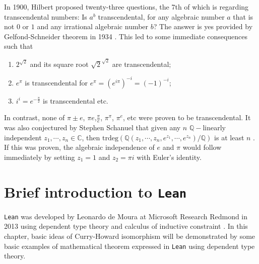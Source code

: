 \documentclass{report}
\theoremstyle{definition}
\begin{document}
In 1900, Hilbert proposed twenty-three questions, the 7th of which is regarding transcendental numbers: Is $a^b$ transcendental, for any algebraic number $a$ that is not $0$ or $1$ and any irrational algebraic number $b$? The answer is yes provided by Gelfond-Schneider theorem in 1934 \cite{gelfond1934septieme}. This led to some immediate consequences such that
\begin{enumerate}
  \item $2^{\sqrt2}$ and its square root ${\sqrt2}^{\sqrt2}$ are transcendental;
  \item $e^{\pi}$ is transcendental for $e^{\pi}=\left(e^{i\pi}\right)^{-i}=\left(-1\right)^{-i}$;
  \item $i^i=e^{-\frac\pi2}$ is transcendental etc.
\end{enumerate}
In contrast, none of $\pi\pm e$, $\pi e$,$\frac\pi e$, $\pi^\pi$, $\pi^e$, etc were proven to be transcendental. It was also conjectured by Stephen Schanuel that given any $n$ $\mathbb Q-$linearly independent $z_1,\cdots, z_n\in\mathbb C$, then $\mathrm{trdeg}\left(\mathbb Q(z_1,\cdots, z_n, e^{z_1},\cdots, e^{z_n})/\mathbb Q\right)$ is at least $n$ \cite{lang1966introduction}. If this was proven, the algebraic independence of $e$ and $\pi$ would follow immediately by setting $z_1=1$ and $z_2=\pi i$ with Euler's identity.

\chapter{Brief introduction to {\tt Lean}}\label{intro:lean}

{\tt \small Lean} was developed by Leonardo de Moura at Microsoft Research Redmond in 2013 using dependent type theory and calculus of inductive constraint \cite{avigad2015theorem}. In this chapter, basic ideas of Curry-Howard isomorphism will be demonstrated by some basic examples of mathematical theorem expressed in {\tt \small Lean} using dependent type theory.
\end{document}
